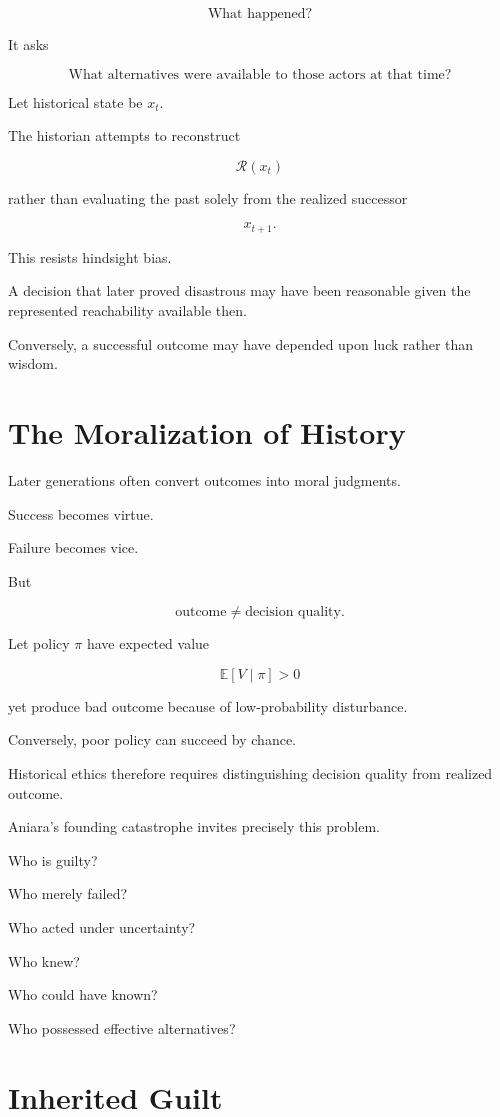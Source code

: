 \documentclass[11pt,oneside]{book}
\theoremstyle{definition}
\theoremstyle{remark}
\newcommand{\R}{\mathcal{R}}
\begin{document}
\[
\text{What happened?}
\]

It asks

\[
\text{What alternatives were available to those actors at that time?}
\]

Let historical state be \(x_t\).

The historian attempts to reconstruct

\[
\R(x_t)
\]

rather than evaluating the past solely from the realized successor

\[
x_{t+1}.
\]

This resists hindsight bias.

A decision that later proved disastrous may have been reasonable given the represented reachability available then.

Conversely, a successful outcome may have depended upon luck rather than wisdom.

\section{The Moralization of History}

Later generations often convert outcomes into moral judgments.

Success becomes virtue.

Failure becomes vice.

But

\[
\text{outcome}
\neq
\text{decision quality}.
\]

Let policy \(\pi\) have expected value

\[
\mathbb E[V\mid\pi]>0
\]

yet produce bad outcome because of low-probability disturbance.

Conversely, poor policy can succeed by chance.

Historical ethics therefore requires distinguishing decision quality from realized outcome.

Aniara's founding catastrophe invites precisely this problem.

Who is guilty?

Who merely failed?

Who acted under uncertainty?

Who knew?

Who could have known?

Who possessed effective alternatives?

\section{Inherited Guilt}
\end{document}
